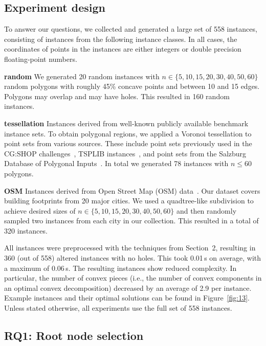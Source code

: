 \documentclass[11pt,a4paper]{article}
\theoremstyle{plain}
\begin{document}
\subsection{Experiment design}

To answer our questions, we collected and generated a large set of 558 instances, consisting of instances from the following instance classes. In all cases, the coordinates of points in the instances are either integers or double precision floating-point numbers.

\textbf{random} We generated 20 random instances with $n \in \{5,10,15,20,30,40,50,60\}$ random polygons with roughly 45\% concave points and between 10 and 15 edges. Polygons may overlap and may have holes. This resulted in 160 random instances.

\textbf{tessellation} Instances derived from well-known publicly available benchmark instance sets. To obtain polygonal regions, we applied a Voronoi tessellation to point sets from various sources. These include point sets previously used in the CG:SHOP challenges~\cite{ref18,ref17}, TSPLIB instances~\cite{ref40}, and point sets from the Salzburg Database of Polygonal Inputs~\cite{ref22}. In total we generated 78 instances with $n \leq 60$ polygons.

\textbf{OSM} Instances derived from Open Street Map (OSM) data~\cite{ref39}. Our dataset covers building footprints from 20 major cities. We used a quadtree-like subdivision to achieve desired sizes of $n \in \{5,10,15,20,30,40,50,60\}$ and then randomly sampled two instances from each city in our collection. This resulted in a total of 320 instances.

All instances were preprocessed with the techniques from Section~2, resulting in 360 (out of 558) altered instances with no holes. This took 0.01\,s on average, with a maximum of 0.06\,s. The resulting instances show reduced complexity. In particular, the number of convex pieces (i.e., the number of convex components in an optimal convex decomposition) decreased by an average of 2.9 per instance. Example instances and their optimal solutions can be found in Figure~\ref{fig:13}. Unless stated otherwise, all experiments use the full set of 558 instances.

\subsection{RQ1: Root node selection}
\end{document}
